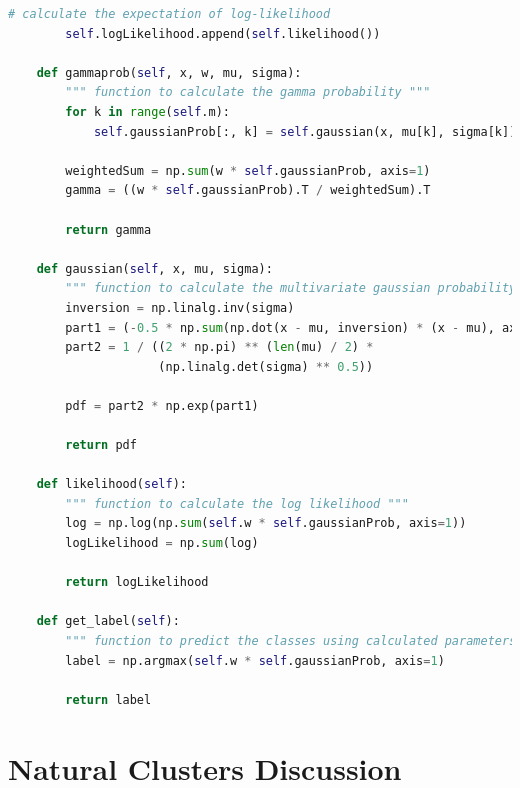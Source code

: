 \begin{description}
\begin{description}
\begin{lstlisting}[language=Python, caption=EM Algorithm Python Code]
        # calculate the expectation of log-likelihood
        self.logLikelihood.append(self.likelihood())

    def gammaprob(self, x, w, mu, sigma):
        """ function to calculate the gamma probability """
        for k in range(self.m):
            self.gaussianProb[:, k] = self.gaussian(x, mu[k], sigma[k])

        weightedSum = np.sum(w * self.gaussianProb, axis=1)
        gamma = ((w * self.gaussianProb).T / weightedSum).T

        return gamma

    def gaussian(self, x, mu, sigma):
        """ function to calculate the multivariate gaussian probability """
        inversion = np.linalg.inv(sigma)
        part1 = (-0.5 * np.sum(np.dot(x - mu, inversion) * (x - mu), axis=1))
        part2 = 1 / ((2 * np.pi) ** (len(mu) / 2) *
                     (np.linalg.det(sigma) ** 0.5))

        pdf = part2 * np.exp(part1)

        return pdf

    def likelihood(self):
        """ function to calculate the log likelihood """
        log = np.log(np.sum(self.w * self.gaussianProb, axis=1))
        logLikelihood = np.sum(log)

        return logLikelihood

    def get_label(self):
        """ function to predict the classes using calculated parameters """
        label = np.argmax(self.w * self.gaussianProb, axis=1)

        return label
\end{lstlisting}
\end{description}
\end{description}

\section{\Large Natural Clusters Discussion}


